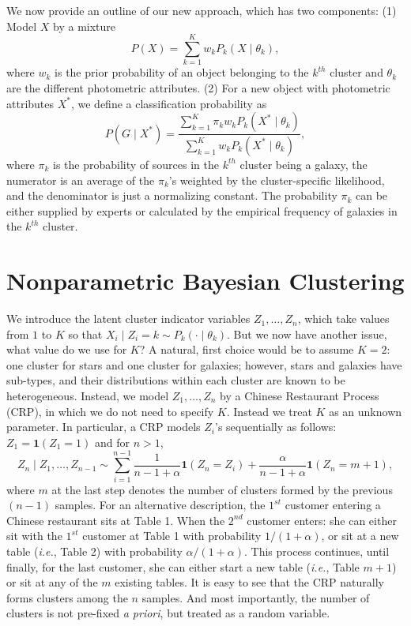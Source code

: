 We now provide an outline of our new approach, which has two components:  (1) Model $X$ by a mixture 
\[ P(X) = \sum_{k=1}^K w_k P_k (X \mid \theta_k), \]
where $w_k$ is the prior probability of an object belonging to the $k^{th}$ cluster and $\theta_k$ are the different photometric attributes. (2) For a new object with photometric attributes $X^*$, we define a classification probability as
\[ P(G \mid X^*) = \frac{\sum_{k=1}^K \pi_k w_k P_k (X^* \mid \theta_k)}{\sum_{k=1}^K w_k P_k( X^* \mid \theta_k)}, \]
where $\pi_k$ is the probability of sources in the $k^{th}$ cluster being a galaxy, the numerator is an average of the $\pi_k$'s weighted by the cluster-specific likelihood, and the denominator is just a normalizing constant. The probability $\pi_k$ can be either supplied by experts or calculated by the empirical frequency of galaxies in the $k^{th}$ cluster. 

\section{Nonparametric Bayesian Clustering}

We introduce the latent cluster indicator variables $Z_1, \dots, Z_n$, which take values from $1$ to $K$ so that $X_i \mid Z_i = k  \sim P_k( \cdot \mid \theta_k).$ But we now have another issue, what value do we use for $K$? A natural, first choice would be to assume $K=2$: one cluster for stars and one cluster for galaxies; however, stars and galaxies have sub-types, and their distributions within each cluster are known to be heterogeneous. Instead, we model $Z_1, \dots, Z_n$ by a Chinese Restaurant Process (CRP), in which we do not need to specify $K$. Instead we treat $K$ as an unknown parameter. In particular, a CRP models $Z_i$'s sequentially as follows: $Z_1 =  \mathbf{1}(Z_1 = 1)$ and for $n > 1$,
\[
Z_{n} \mid Z_1, \dots, Z_{n-1} \sim  \sum_{i=1}^{n-1} \frac{1}{n-1 + \alpha} \mathbf{1}(Z_n = Z_i) + \frac{\alpha}{n-1+ \alpha} \mathbf{1}(Z_n = m+1), 
\]
where $m$ at the last step denotes the number of clusters formed by the previous $(n-1)$ samples. For an alternative description, the $1^{st}$ customer entering a Chinese restaurant sits at Table 1. When the $2^{nd}$ customer enters: she can either sit with the $1^{st}$ customer at Table 1 with probability $1/(1 + \alpha)$, or sit at a new table (\textit{i.e.}, Table 2)  with probability $\alpha / ( 1 + \alpha)$. This process continues, until finally, for the last customer, she can either start a new table (\textit{i.e.}, Table $m+1$) or sit at any of the $m$ existing tables. It is easy to see that the CRP naturally forms clusters among the $n$ samples. And most importantly, the number of clusters is not pre-fixed \textit{a priori}, but treated as a random variable. 

